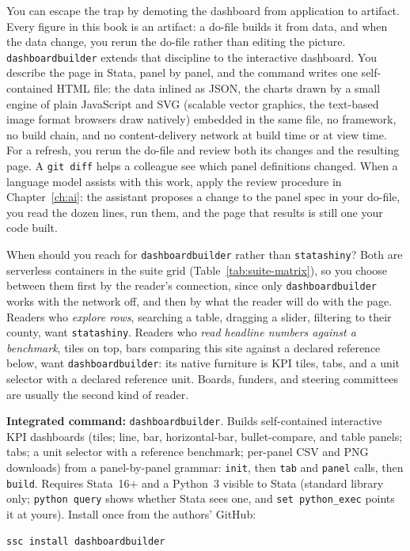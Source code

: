 You can escape the trap by demoting the dashboard from application to artifact. Every figure in this book is an artifact: a do-file builds it from data, and when the data change, you rerun the do-file rather than editing the picture. \texttt{dashboardbuilder} extends that discipline to the interactive dashboard. You describe the page in Stata, panel by panel, and the command writes one self-contained HTML file: the data inlined as JSON, the charts drawn by a small engine of plain JavaScript and SVG (scalable vector graphics, the text-based image format browsers draw natively) embedded in the same file, no framework, no build chain, and no content-delivery network at build time or at view time. For a refresh, you rerun the do-file and review both its changes and the resulting page. A \texttt{git diff} helps a colleague see which panel definitions changed. When a language model assists with this work, apply the review procedure in Chapter~\ref{ch:ai}: the assistant proposes a change to the panel spec in your do-file, you read the dozen lines, run them, and the page that results is still one your code built.

When should you reach for \texttt{dashboardbuilder} rather than \texttt{statashiny}? Both are serverless containers in the suite grid (Table~\ref{tab:suite-matrix}), so you choose between them first by the reader's connection, since only \texttt{dashboardbuilder} works with the network off, and then by what the reader will do with the page. Readers who \emph{explore rows}, searching a table, dragging a slider, filtering to their county, want \texttt{statashiny}. Readers who \emph{read headline numbers against a benchmark}, tiles on top, bars comparing this site against a declared reference below, want \texttt{dashboardbuilder}: its native furniture is KPI tiles, tabs, and a unit selector with a declared reference unit. Boards, funders, and steering committees are usually the second kind of reader.

\begin{kaobox}[frametitle=Package Integration: \texttt{dashboardbuilder}]
\textbf{Integrated command:} \texttt{dashboardbuilder}. Builds self-contained interactive KPI dashboards (tiles; line, bar, horizontal-bar, bullet-compare, and table panels; tabs; a unit selector with a reference benchmark; per-panel CSV and PNG downloads) from a panel-by-panel grammar: \texttt{init}, then \texttt{tab} and \texttt{panel} calls, then \texttt{build}. Requires Stata~16+ and a Python~3 visible to Stata (standard library only; \texttt{python query} shows whether Stata sees one, and \texttt{set python\_exec} points it at yours). Install once from the authors' GitHub:
\par
{\footnotesize
\begin{verbatim}
ssc install dashboardbuilder
\end{verbatim}
}
\end{kaobox}

